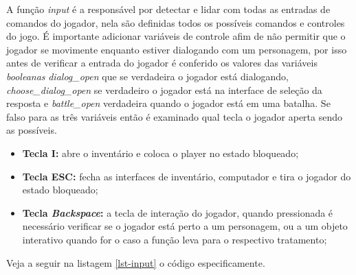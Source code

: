 A função \textit{input} é a responsável por detectar e lidar com todas as entradas de comandos do jogador, nela são definidas todos os possíveis comandos e controles do jogo. É importante adicionar variáveis de controle afim de não permitir que o jogador se movimente enquanto estiver dialogando com um personagem,  por isso antes de verificar a entrada do jogador é conferido os valores das variáveis \textit{booleanas} \textit{dialog\_open} que se verdadeira o jogador está dialogando, \textit{choose\_dialog\_open} se verdadeiro o jogador está na interface de seleção da resposta e \textit{battle\_open} verdadeira quando o jogador está em uma batalha. Se falso para as três variáveis então é examinado qual tecla o jogador aperta sendo as possíveis.
\begin{itemize}
    \item \textbf{Tecla I: }abre o inventário e coloca o player no estado bloqueado;
    \item \textbf{Tecla ESC: }fecha as interfaces de inventário, computador e tira o jogador do estado bloqueado;
    \item \textbf{Tecla \textit{Backspace}: }a tecla de interação do jogador, quando pressionada é necessário verificar se o jogador está perto a um personagem, ou a um objeto interativo quando for o caso a função leva para o respectivo tratamento;
\end{itemize}

Veja a seguir na listagem \ref{lst-input} o código especificamente.
 







